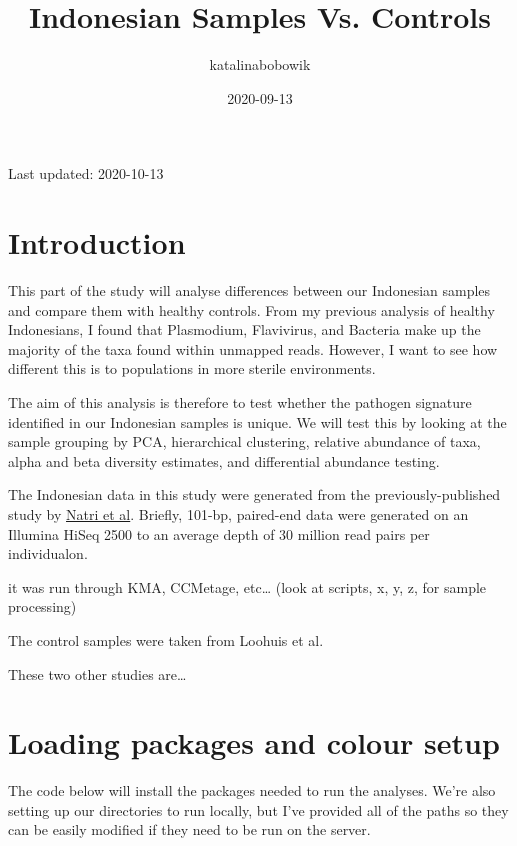 \documentclass[]{article}
\title{Indonesian Samples Vs. Controls}
\author{katalinabobowik}
\date{2020-09-13}
\begin{document}
\maketitle

Last updated: 2020-10-13

\hypertarget{introduction}{%
\section{Introduction}\label{introduction}}

This part of the study will analyse differences between our Indonesian
samples and compare them with healthy controls. From my previous
analysis of healthy Indonesians, I found that Plasmodium, Flavivirus,
and Bacteria make up the majority of the taxa found within unmapped
reads. However, I want to see how different this is to populations in
more sterile environments.

The aim of this analysis is therefore to test whether the pathogen
signature identified in our Indonesian samples is unique. We will test
this by looking at the sample grouping by PCA, hierarchical clustering,
relative abundance of taxa, alpha and beta diversity estimates, and
differential abundance testing.

The Indonesian data in this study were generated from the
previously-published study by
\href{https://journals.plos.org/plosgenetics/article?id=10.1371/journal.pgen.1008749}{Natri
et al}. Briefly, 101-bp, paired-end data were generated on an Illumina
HiSeq 2500 to an average depth of 30 million read pairs per
individualon.

it was run through KMA, CCMetage, etc\ldots{} (look at scripts, x, y, z,
for sample processing)

The control samples were taken from Loohuis et al.

These two other studies are\ldots{}

\hypertarget{loading-packages-and-colour-setup}{%
\section{Loading packages and colour
setup}\label{loading-packages-and-colour-setup}}

The code below will install the packages needed to run the analyses.
We're also setting up our directories to run locally, but I've provided
all of the paths so they can be easily modified if they need to be run
on the server.
\end{document}
